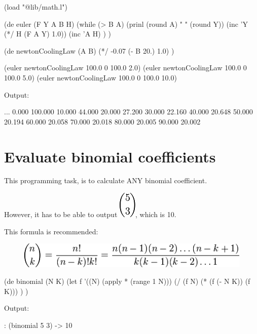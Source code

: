 \begin{wideverbatim}

(load "@lib/math.l")

(de euler (F Y A B H)
   (while (> B A)
      (prinl (round A) " " (round Y))
      (inc 'Y (*/ H (F A Y) 1.0))
      (inc 'A H) ) )

(de newtonCoolingLaw (A B)
   (*/ -0.07 (- B 20.) 1.0) )

(euler newtonCoolingLaw 100.0 0 100.0 2.0)
(euler newtonCoolingLaw 100.0 0 100.0 5.0)
(euler newtonCoolingLaw 100.0 0 100.0 10.0)

Output:

...
0.000 100.000
10.000 44.000
20.000 27.200
30.000 22.160
40.000 20.648
50.000 20.194
60.000 20.058
70.000 20.018
80.000 20.005
90.000 20.002

\end{wideverbatim}

\pagebreak{}
\section*{Evaluate binomial coefficients}

This programming task, is to calculate ANY binomial coefficient.

However, it has to be able to output
\includegraphics[scale=.6]{graphics/33a9aa45fa4dad1deffa8c921462ad74.png},
which is 10.

This formula is recommended:

\begin{figure}[H]
\centering
\includegraphics[scale=.6]{graphics/b7521c74cd98e492ade8dd3e9f40669a.png}
\end{figure}

\begin{wideverbatim}

(de binomial (N K)
   (let f '((N) (apply * (range 1 N)))
      (/ (f N) (* (f (- N K)) (f K))) ) )

Output:

: (binomial 5 3)
-> 10

\end{wideverbatim}

